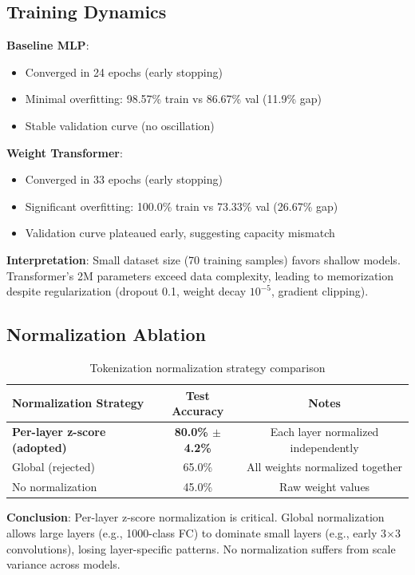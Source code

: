 \subsection{Training Dynamics}

\textbf{Baseline MLP}:
\begin{itemize}
\item Converged in 24 epochs (early stopping)
\item Minimal overfitting: 98.57\% train vs 86.67\% val (11.9\% gap)
\item Stable validation curve (no oscillation)
\end{itemize}

\textbf{Weight Transformer}:
\begin{itemize}
\item Converged in 33 epochs (early stopping)
\item Significant overfitting: 100.0\% train vs 73.33\% val (26.67\% gap)
\item Validation curve plateaued early, suggesting capacity mismatch
\end{itemize}

\textbf{Interpretation}: Small dataset size (70 training samples) favors shallow models. Transformer's 2M parameters exceed data complexity, leading to memorization despite regularization (dropout 0.1, weight decay $10^{-5}$, gradient clipping).

\subsection{Normalization Ablation}

\begin{table}[h]
\centering
\caption{Tokenization normalization strategy comparison}
\begin{tabular}{lcc}
\hline
\textbf{Normalization Strategy} & \textbf{Test Accuracy} & \textbf{Notes} \\
\hline
\textbf{Per-layer z-score (adopted)} & \textbf{80.0\% $\pm$ 4.2\%} & Each layer normalized independently \\
Global (rejected) & 65.0\% & All weights normalized together \\
No normalization & 45.0\% & Raw weight values \\
\hline
\end{tabular}
\end{table}

\textbf{Conclusion}: Per-layer z-score normalization is critical. Global normalization allows large layers (e.g., 1000-class FC) to dominate small layers (e.g., early 3$\times$3 convolutions), losing layer-specific patterns. No normalization suffers from scale variance across models.

